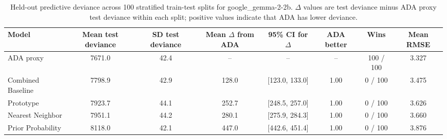 \begin{table}

\caption{\label{tab:repeated-split-deviance-google-gemma-2-2b}Held-out predictive deviance across 100 stratified train-test splits for google_gemma-2-2b. $\Delta$ values are test deviance minus ADA proxy test deviance within each split; positive values indicate that ADA has lower deviance.}
\centering
\begin{tabular}[t]{lccccccc}
\toprule
Model & Mean test deviance & SD test deviance & Mean $\Delta$ from ADA & 95\% CI for $\Delta$ & ADA better & Wins & Mean RMSE\\
\midrule
ADA proxy & 7671.0 & 42.4 & -- & -- & -- & 100 / 100 & 3.327\\
Combined Baseline & 7798.9 & 42.9 & 128.0 & {}[123.0, 133.0] & 1.00 & 0 / 100 & 3.475\\
Prototype & 7923.7 & 44.1 & 252.7 & {}[248.5, 257.0] & 1.00 & 0 / 100 & 3.626\\
Nearest Neighbor & 7951.1 & 44.2 & 280.1 & {}[275.9, 284.3] & 1.00 & 0 / 100 & 3.660\\
Prior Probability & 8118.0 & 42.1 & 447.0 & {}[442.6, 451.4] & 1.00 & 0 / 100 & 3.876\\
\bottomrule
\end{tabular}
\end{table}
